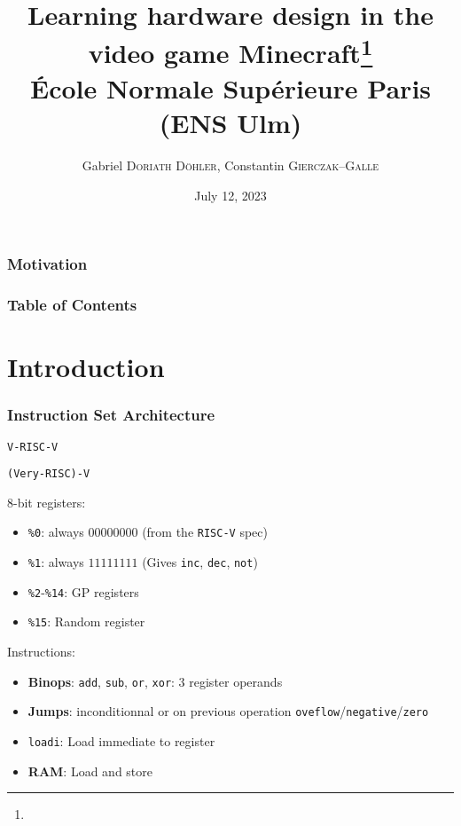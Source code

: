 \documentclass{beamer}
\title{Learning hardware design in the video game Minecraft\footnote{\tiny{}\reproduce}\\\small{} École Normale Supérieure Paris (ENS Ulm)}
\author{Gabriel \textsc{Doriath Döhler}, Constantin \textsc{Gierczak--Galle}}
\date{July 12, 2023}
\newcommand{\rv}{\texttt{RISC-V}}
\newcommand{\vrv}{\texttt{V-RISC-V}}
\begin{document}
\beamertemplatenavigationsymbolsempty
{}

\maketitle

\begin{frame}[fragile]
	\frametitle{Motivation}

\end{frame}

\begin{frame}[fragile]
	\frametitle{Table of Contents}
	\tableofcontents
\end{frame}

\section{Introduction}



\begin{frame}
	\frametitle{Instruction Set Architecture}
	\vrv

	\texttt{(Very-RISC)-V}

	$8$-bit registers:

	\begin{itemize}
		\item \texttt{\%0}: always $00000000$ (from the \rv{} spec)
		\item \texttt{\%1}: always $11111111$ (Gives \texttt{inc},
		      \texttt{dec}, \texttt{not})
		\item \texttt{\%2}-\texttt{\%14}: GP registers
		\item \texttt{\%15}: Random register
	\end{itemize}

	Instructions:
	\begin{itemize}
		\item \textbf{Binops}: \texttt{add}, \texttt{sub}, \texttt{or},
		      \texttt{xor}: $3$ register operands
		\item \textbf{Jumps}: inconditionnal or on previous operation
		      \texttt{oveflow}/\texttt{negative}/\texttt{zero}
		\item \texttt{loadi}: Load immediate to register
		\item \textbf{RAM}: Load and store
	\end{itemize}
\end{frame}
\end{document}
